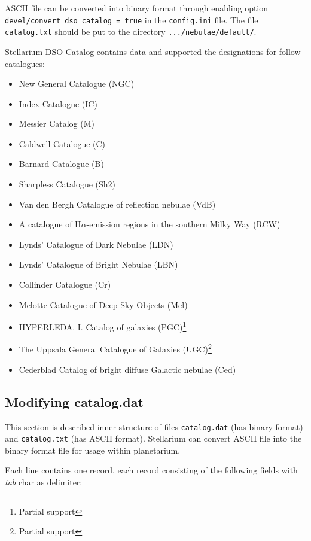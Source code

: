 ASCII file can be converted into binary format through enabling option
\texttt{devel/convert\_dso\_catalog\ =\ true} in the \texttt{config.ini}
file. The file \texttt{catalog.txt} should be put to the directory
\texttt{.../nebulae/default/}.

Stellarium DSO Catalog contains data and supported the designations for
follow catalogues:

\begin{itemize}
\item
  New General Catalogue (NGC)
\item
  Index Catalogue (IC)
\item
  Messier Catalog (M)
\item
  Caldwell Catalogue (C)
\item
  Barnard Catalogue (B)
\item
  Sharpless Catalogue (Sh2)
\item
  Van den Bergh Catalogue of reflection nebulae (VdB)
\item
  A catalogue of H$\alpha$-emission regions in the southern Milky Way (RCW)
\item
  Lynds' Catalogue of Dark Nebulae (LDN)
\item
  Lynds' Catalogue of Bright Nebulae (LBN)
\item
  Collinder Catalogue (Cr)
\item
  Melotte Catalogue of Deep Sky Objects (Mel)
\item
  HYPERLEDA. I. Catalog of galaxies (PGC)\footnote{Partial support}
\item
  The Uppsala General Catalogue of Galaxies (UGC)\footnote{Partial
    support}
\item
  Cederblad Catalog of bright diffuse Galactic nebulae (Ced)
\end{itemize}

\subsection{Modifying catalog.dat}\label{modifying-catalog.dat}

This section is described inner structure of files \texttt{catalog.dat}
(has binary format) and \texttt{catalog.txt} (has ASCII format).
Stellarium can convert ASCII file into the binary format file for usage
within planetarium.

Each line contains one record, each record consisting of the following
fields with \emph{tab} char as delimiter:

